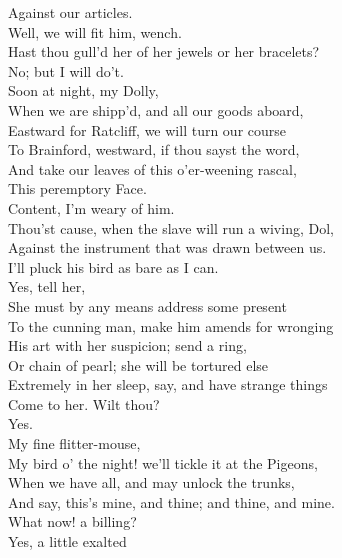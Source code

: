 \documentclass[a4paper,oneside]{memoir}
\begin{document}
\begin{drama*}
Against our articles.\\
\subtlespeaks {} Well, we will fit him, wench.\\
Hast thou gull'd her of her jewels or her bracelets?\\
\dolspeaks No; but I will do't.\\
\subtlespeaks {} Soon at night, my Dolly,\\
When we are shipp'd, and all our goods aboard,\\
Eastward for Ratcliff, we will turn our course\\
To Brainford, westward, if thou sayst the word,\\
And take our leaves of this o'er-weening rascal,\\
This peremptory Face.\\
\dolspeaks {} Content, I'm weary of him.\\
\subtlespeaks Thou'st cause, when the slave will run a wiving, Dol,\\
Against the instrument that was drawn between us.\\
\dolspeaks I'll pluck his bird as bare as I can.\\
\subtlespeaks {} Yes, tell her,\\
She must by any means address some present\\
To the cunning man, make him amends for wronging\\
His art with her suspicion; send a ring,\\
Or chain of pearl; she will be tortured else\\
Extremely in her sleep, say, and have strange things\\
Come to her. Wilt thou?\\
\dolspeaks {} Yes.\\
\subtlespeaks {} My fine flitter-mouse,\\
My bird o' the night! we'll tickle it at the Pigeons,\\
When we have all, and may unlock the trunks,\\
And say, this's mine, and thine; and thine, and mine.\\
\facespeaks What now! a billing?\\
\subtlespeaks {} Yes, a little exalted\\

\end{drama*}
\end{document}
